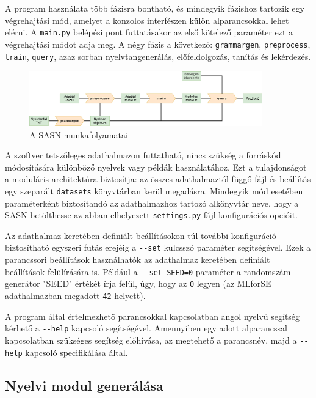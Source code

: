 \documentclass[twoside, 12pt]{report}
\newcommand{\graphicswidth}{0.9\textwidth}
\begin{document}
A program használata több fázisra bontható, és mindegyik fázishoz tartozik egy végrehajtási mód, amelyet a konzolos interfészen külön alparancsokkal lehet elérni. A \verb|main.py| belépési pont futtatásakor az első kötelező paraméter ezt a végrehajtási módot adja meg. A négy fázis a következő: \verb|grammargen|, \verb|preprocess|, \verb|train|, \verb|query|, azaz sorban nyelvtangenerálás, előfeldolgozás, tanítás és lekérdezés.

\begin{figure}[h]
  \centering
  \includegraphics[width=\graphicswidth]{munkafolyamat.png}
  \caption{A SASN munkafolyamatai}
\end{figure}

A szoftver tetszőleges adathalmazon futtatható, nincs szükség a forráskód módosítására különböző nyelvek vagy példák használatához. Ezt a tulajdonságot a moduláris architektúra biztosítja: az összes adathalmaztól függő fájl és beállítás egy szeparált \verb|datasets| könyvtárban kerül megadásra. Mindegyik mód esetében paraméterként biztosítandó az adathalmazhoz tartozó alkönyvtár neve, hogy a SASN betölthesse az abban elhelyezett \verb|settings.py| fájl konfigurációs opcióit.

Az adathalmaz keretében definiált beállításokon túl további konfiguráció biztosítható egyszeri futás erejéig a \verb|--set| kulcsszó paraméter segítségével. Ezek a parancssori beállítások használhatók az adathalmaz keretében definiált beállítások felülírására is. Például a \verb|--set SEED=0| paraméter a randomszám-generátor "SEED" értékét írja felül, úgy, hogy az \verb|0| legyen (az MLforSE adathalmazban megadott \verb|42| helyett).

A program által értelmezhető parancsokkal kapcsolatban angol nyelvű segítség kérhető a \verb|--help| kapcsoló segítségével. Amennyiben egy adott alparancssal kapcsolatban szükséges segítség előhívása, az megtehető a parancsnév, majd a \verb|--help| kapcsoló specifikálása által.

\subsection{Nyelvi modul generálása}
\end{document}
